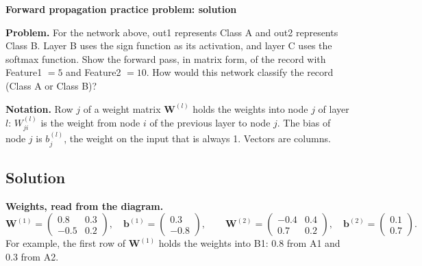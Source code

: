 \documentclass[11pt]{article}
\begin{document}
{\Large\bfseries Forward propagation practice problem: solution}

\begin{center}
\end{center}

\textbf{Problem.} For the network above, out1 represents Class A and out2 represents Class B.
Layer B uses the sign function as its activation, and layer C uses the softmax function. Show the
forward pass, in matrix form, of the record with Feature1 $= 5$ and Feature2 $= 10$. How would this
network classify the record (Class A or Class B)?

\textbf{Notation.} Row $j$ of a weight matrix $\bm{W}^{(l)}$ holds the weights into node $j$ of layer
$l$: $W^{(l)}_{ji}$ is the weight from node $i$ of the previous layer to node $j$. The bias of node $j$
is $b^{(l)}_j$, the weight on the input that is always 1. Vectors are columns.

\subsection*{Solution}

\textbf{Weights, read from the diagram.}
\[
\bm{W}^{(1)} = \begin{pmatrix} 0.8 & 0.3 \\ -0.5 & 0.2 \end{pmatrix}, \quad
\bm{b}^{(1)} = \begin{pmatrix} 0.3 \\ -0.8 \end{pmatrix}, \qquad
\bm{W}^{(2)} = \begin{pmatrix} -0.4 & 0.4 \\ 0.7 & 0.2 \end{pmatrix}, \quad
\bm{b}^{(2)} = \begin{pmatrix} 0.1 \\ 0.7 \end{pmatrix}.
\]
For example, the first row of $\bm{W}^{(1)}$ holds the weights into B1: 0.8 from A1 and 0.3 from A2.
\end{document}
